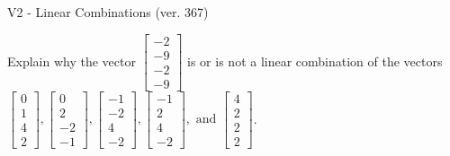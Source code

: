 \begin{exercise}
  \begin{exerciseTitle}V2 - Linear Combinations (ver. 367)\end{exerciseTitle}
  \begin{exerciseStatement}
    Explain why the vector \(\left[\begin{array}{c}
-2 \\
-9 \\
-2 \\
-9
\end{array}\right]\)  is or is not a linear 
	combination of the vectors \(\left[\begin{array}{c}
0 \\
1 \\
4 \\
2
\end{array}\right] , \left[\begin{array}{c}
0 \\
2 \\
-2 \\
-1
\end{array}\right] , \left[\begin{array}{c}
-1 \\
-2 \\
4 \\
-2
\end{array}\right] , \left[\begin{array}{c}
-1 \\
2 \\
4 \\
-2
\end{array}\right] , \text{ and } \left[\begin{array}{c}
4 \\
2 \\
2 \\
2
\end{array}\right]\).
	



\end{exerciseStatement}
\end{exercise}
